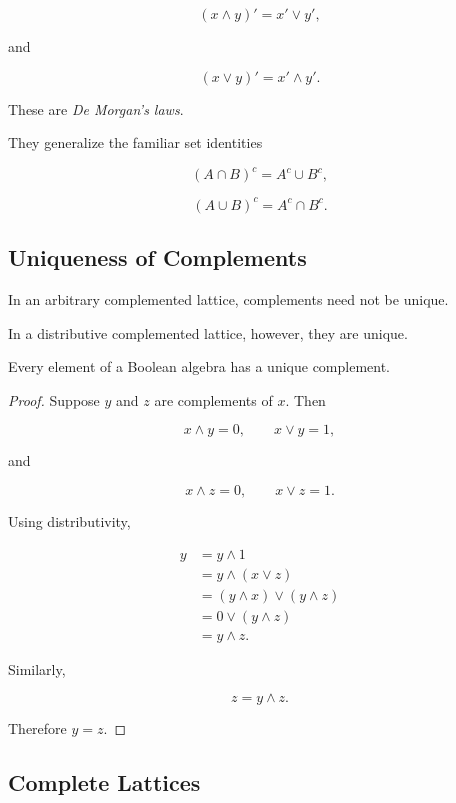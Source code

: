 \[ (x\wedge y)'=x'\vee y', \]

and

\[ (x\vee y)'=x'\wedge y'. \]

These are \emph{De Morgan's laws}.

They generalize the familiar set identities

\[ (A\cap B)^c=A^c\cup B^c, \]

\[ (A\cup B)^c=A^c\cap B^c. \]

\subsection{Uniqueness of Complements}
\label{subsec:unique-complements}

In an arbitrary complemented lattice, complements need not be unique.

In a distributive complemented lattice, however, they are unique.

\begin{theorem}
Every element of a Boolean algebra has a unique complement.
\end{theorem}

\begin{proof}
Suppose \(y\) and \(z\) are complements of \(x\). Then

\[ x\wedge y=0,\qquad x\vee y=1, \]

and

\[ x\wedge z=0,\qquad x\vee z=1. \]

Using distributivity,

\[
\begin{aligned}
y
&=y\wedge1\\
&=y\wedge(x\vee z)\\
&=(y\wedge x)\vee(y\wedge z)\\
&=0\vee(y\wedge z)\\
&=y\wedge z.
\end{aligned}
\]

Similarly,

\[ z=y\wedge z. \]

Therefore \(y=z\).
\end{proof}

\subsection{Complete Lattices}
\label{subsec:complete-lattices}

